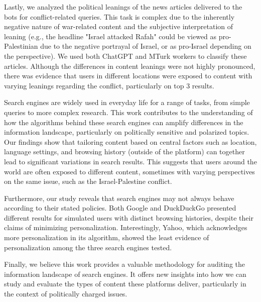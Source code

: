 Lastly, we analyzed the political leanings of the news articles delivered to the bots for conflict-related queries. This task is complex due to the inherently negative nature of war-related content and the subjective interpretation of leaning (e.g., the headline "Israel attacked Rafah" could be viewed as pro-Palestinian due to the negative portrayal of Israel, or as pro-Israel depending on the perspective). We used both ChatGPT and MTurk workers to classify these articles. Although the differences in content leanings were not highly pronounced, there was evidence that users in different locations were exposed to content with varying leanings regarding the conflict, particularly on top 3 results.

Search engines are widely used in everyday life for a range of tasks, from simple queries to more complex research. This work contributes to the understanding of how the algorithms behind these search engines can amplify differences in the information landscape, particularly on politically sensitive and polarized topics. Our findings show that tailoring content based on central factors such as location, language settings, and browsing history (outside of the platform) can together lead to significant variations in search results. This suggests that users around the world are often exposed to different content, sometimes with varying perspectives on the same issue, such as the Israel-Palestine conflict.

Furthermore, our study reveals that search engines may not always behave according to their stated policies. Both Google and DuckDuckGo presented different results for simulated users with distinct browsing histories, despite their claims of minimizing personalization. Interestingly, Yahoo, which acknowledges more personalization in its algorithm, showed the least evidence of personalization among the three search engines tested.

Finally, we believe this work provides a valuable methodology for auditing the information landscape of search engines. It offers new insights into how we can study and evaluate the types of content these platforms deliver, particularly in the context of politically charged issues.